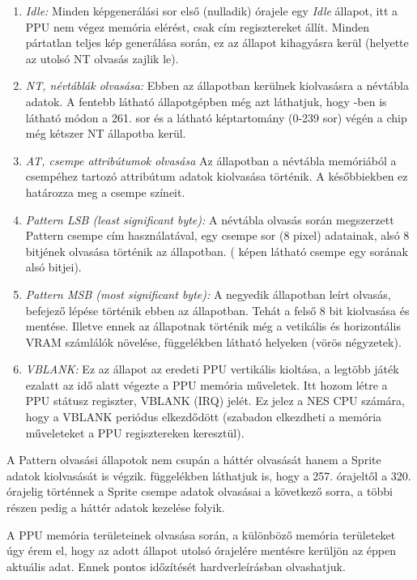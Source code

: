	\begin{enumerate}
		\item \emph{Idle:} Minden képgenerálási sor első (nulladik) órajele egy \emph{Idle} állapot, itt a PPU nem végez memória elérést, csak cím regisztereket állít. Minden pártatlan teljes kép generálása során, ez az állapot kihagyásra kerül (helyette az utolsó NT olvasás zajlik le).
		\item \emph{NT, névtáblák olvasása:} Ebben az állapotban kerülnek kiolvasásra a névtábla adatok. A fentebb látható állapotgépben még azt láthatjuk, hogy -ben is látható módon a 261. sor és a látható képtartomány (0-239 sor) végén a chip még kétszer NT állapotba kerül.
		\item \emph{AT, csempe attribútumok olvasása} Az állapotban a névtábla memóriából a csempéhez tartozó attribútum adatok kiolvasása történik. A későbbiekben ez határozza meg a csempe színeit.
		\item\emph{Pattern LSB (least significant byte):} A névtábla olvasás során megszerzett Pattern csempe cím használatával, egy csempe sor (8 pixel) adatainak, alsó 8 bitjének olvasása történik az állapotban. ( képen látható csempe egy sorának alsó bitjei).
		\item \emph{Pattern MSB (most significant byte):} A negyedik állapotban leírt olvasás, befejező lépése történik ebben az állapotban. Tehát a felső 8 bit kiolvasása és mentése. Illetve ennek az állapotnak történik még a vetikális és horizontális VRAM számlálók növelése,  függelékben látható helyeken (vörös négyzetek).
		\item \emph{VBLANK:} Ez az állapot az eredeti PPU vertikális kioltása, a legtöbb játék ezalatt az idő alatt végezte a PPU memória műveletek. Itt hozom létre a PPU státusz regiszter, VBLANK (IRQ) jelét. Ez jelez a NES CPU számára, hogy a VBLANK periódus elkezdődött (szabadon elkezdheti a memória műveleteket a PPU regisztereken keresztül). 
	\end{enumerate} 
	
	A Pattern olvasási állapotok nem csupán a háttér olvasását hanem a Sprite adatok kiolvasását is végzik.  függelékben láthatjuk is, hogy a 257. órajeltől a 320. órajelig történnek a Sprite csempe adatok olvasásai a következő sorra, a többi részen pedig a háttér adatok kezelése folyik.
	
	A PPU memória területeinek olvasása során, a különböző memória területeket úgy érem el, hogy az adott állapot utolsó órajelére mentésre kerüljön az éppen aktuális adat. Ennek pontos időzítését  hardverleírásban olvashatjuk.
	

